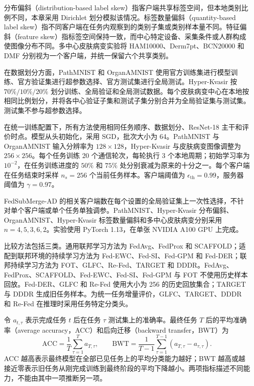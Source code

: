 分布偏斜（distribution-based label skew）指客户端共享标签空间，但本地类别比例不同，本章采用 Dirichlet 划分模拟该情况\cite{hsu2019dirichlet}。标签数量偏斜（quantity-based label skew）指不同客户端在任务内观察到的类别子集或类别样本量不同。特征偏斜（feature skew）指标签空间保持一致，而中心特定设备、采集条件或人群构成使图像分布不同。多中心皮肤病变实验将 HAM10000、Derm7pt、BCN20000 和 DMF 分别视为一个客户端，并统一保留六个共享类别。

在数据划分方面，PathMNIST 和 OrganAMNIST 使用官方训练集进行模型训练、官方验证集进行超参数选择、官方测试集进行全局测试。Hyper-Kvasir 按 $70\%/10\%/20\%$ 划分训练、全局验证和全局测试数据。每个皮肤病变中心在本地按相同比例划分，并将各中心验证子集和测试子集分别合并为全局验证集与测试集。测试集不参与超参数选择。

在统一训练配置下，所有方法使用相同任务顺序、数据划分、ResNet-18 主干和评价时点\cite{he2016resnet}。模型从头初始化，采用 SGD，批次大小为 64。PathMNIST 与 OrganAMNIST 输入分辨率为 $128\times128$，Hyper-Kvasir 与皮肤病变图像调整为 $256\times256$。每个任务训练 20 个通信轮次，每轮执行 3 个本地周期；初始学习率为 $10^{-2}$，在任务训练进度的 $50\%$ 和 $75\%$ 处分别衰减为原来的十分之一。每个客户端在任务结束时采样 $n_s=256$ 个当前任务样本。客户端阈值为 $\epsilon_{\mathrm{th}}=0.99$，服务器阈值为 $\gamma=0.97$。

FedSubMerge-AD 的相关客户端数在每个设置的全局验证集上一次性选择，不针对单个客户端或单个任务单独调参。PathMNIST、Hyper-Kvasir 分布偏斜、OrganAMNIST、Hyper-Kvasir 标签数量偏斜和多中心皮肤病变分别采用 $n=4,5,3,6,2$。实验使用 PyTorch 1.13，在单张 NVIDIA A100 GPU 上完成。

比较方法包括三类。通用联邦学习方法为 FedAvg、FedProx 和 SCAFFOLD\cite{mcmahan2017fedavg,li2020fedprox,karimireddy2020scaffold}；适配到联邦环境的持续学习方法为 Fed-EWC、Fed-SI、Fed-GPM 和 Fed-DER\cite{kirkpatrick2017ewc,method_regu_si,saha2021gpm,method_replay_der}；联邦持续学习方法为 FOT、GLFC、Re-Fed、TARGET 和 DDDR\cite{bakman2024fot,dong2022glfc,li2024Refed,zhang2023target,liang2024dddr}。FedAvg、FedProx、SCAFFOLD、Fed-EWC、Fed-SI、Fed-GPM 与 FOT 不使用历史样本回放。Fed-DER、GLFC 和 Re-Fed 使用大小为 256 的历史回放集合；TARGET 与 DDDR 生成旧任务样本。为统一任务增量评价，GLFC、TARGET、DDDR 和 Re-Fed 在推理时采用任务特定分类头。

令 $a_{t,\tau}$ 表示完成任务 $t$ 后在任务 $\tau$ 测试集上的准确率。最终任务 $T$ 后的平均准确率（average accuracy，ACC）和后向迁移（backward transfer，BWT）为\cite{method_replay_gem}
\begin{equation}
\mathrm{ACC}
=
\frac{1}{T}\sum_{\tau=1}^{T}a_{T,\tau},
\qquad
\mathrm{BWT}
=
\frac{1}{T-1}\sum_{\tau=1}^{T-1}
\left(a_{T,\tau}-a_{\tau,\tau}\right).
\label{eq:fedsubmerge-acc-bwt}
\end{equation}
ACC 越高表示最终模型在全部已见任务上的平均分类能力越好；BWT 越高或越接近零表示旧任务从刚完成训练到最终阶段的平均下降越小。两项指标描述不同能力，不能由其中一项推断另一项。

